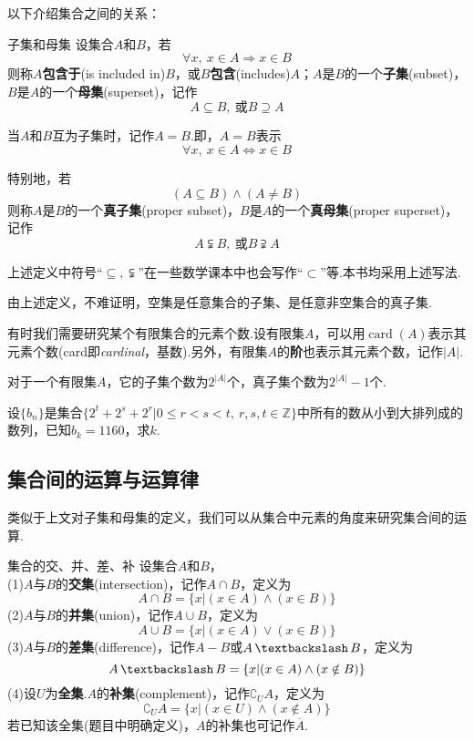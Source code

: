 \documentclass[lang=cn, zihao=4.5]{elegantbook}
\DeclareMathOperator{\card}{card}
\DeclareMathOperator{\setjianfa}{\textbackslash}
\begin{document}
以下介绍集合之间的关系：

\begin{definition}{子集和母集}
	设集合$A$和$B$，若$$\forall x,~x \in A \Rightarrow x \in B$$则称$A$\textbf{包含于}(is included in)$B$，或$B$\textbf{包含}(includes)$A$；$A$是$B$的一个\textbf{子集}(subset)，$B$是$A$的一个\textbf{母集}(superset)，记作$$A \subseteq B,~ \text{或} B \supseteq A$$
	
	当$A$和$B$互为子集时，记作$A=B$.即，$A=B$表示$$\forall x,~ x \in A \Leftrightarrow x \in B$$
	
	特别地，若$$(A \subseteq B) \wedge (A \neq B)$$则称$A$是$B$的一个\textbf{真子集}(proper subset)，$B$是$A$的一个\textbf{真母集}(proper superset)，记作$$A \subsetneqq B,~ \text{或} B \supsetneqq A$$
\end{definition}
\begin{note}
	上述定义中符号“$\subseteq ,\subsetneqq$”在一些数学课本中也会写作“$\subset$”等.本书均采用上述写法.
\end{note}

由上述定义，不难证明，空集是任意集合的子集、是任意非空集合的真子集.

有时我们需要研究某个有限集合的元素个数.设有限集$A$，可以用$\card (A)$表示其元素个数(card即\textit{cardinal}，基数).另外，有限集$A$的\textbf{阶}也表示其元素个数，记作$|A|$.

\begin{example}
	对于一个有限集$A$，它的子集个数为$2^{|A|}$个，真子集个数为$2^{|A|}-1$个.
\end{example}
\begin{example}
	设$\{ b_n \}$是集合$\{ 2^t+2^s+2^r | 0 \leq r < s < t,~r,s,t \in \mathbb{Z} \}$中所有的数从小到大排列成的数列，已知$b_k=1160$，求$k$.
\end{example}

\subsection{集合间的运算与运算律}

类似于上文对子集和母集的定义，我们可以从集合中元素的角度来研究集合间的运算.

\begin{definition}{集合的交、并、差、补}
	设集合$A$和$B$， \\
	(1)$A$与$B$的\textbf{交集}(intersection)，记作$A \cap B$，定义为$$A \cap B = \{ x|(x \in A) \wedge (x \in B) \}$$
	(2)$A$与$B$的\textbf{并集}(union)，记作$A \cup B$，定义为$$A \cup B = \{ x|(x \in A) \vee (x \in B) \}$$
	(3)$A$与$B$的\textbf{差集}(difference)，记作$A-B$或$A \setjianfa B$，定义为$$A \setjianfa B = \{ x|(x \in A) \wedge (x \notin B) \}$$
	(4)设$U$为\textbf{全集}.$A$的\textbf{补集}(complement)，记作$\complement _{U}{A}$，定义为$$\complement _{U}{A} = \{ x|(x \in U) \wedge (x \notin A) \}$$
	若已知该全集(题目中明确定义)，$A$的补集也可记作$\overline{A}$.
\end{definition}
\end{document}
